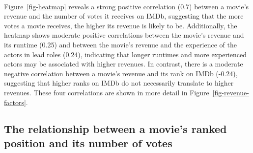 \begin{multicols}{2}
            \paragraph{}
                Figure~\ref{fig-heatmap} reveals a strong positive correlation (0.7) between a
                    movie's revenue and the number of votes it receives on IMDb, suggesting that
                    the more votes a movie receives, the higher its revenue is likely to be.
                Additionally, the heatmap shows moderate positive correlations between the
                    movie's revenue and its runtime (0.25) and between the movie's revenue and the
                    experience of the actors in lead roles (0.24), indicating that longer runtimes
                    and more experienced actors may be associated with higher revenues.
                In contrast, there is a moderate negative correlation between a movie's revenue
                    and its rank on IMDb (-0.24), suggesting that higher ranks on IMDb do not
                    necessarily translate to higher revenues.
                These four correlations are shown in more detail in
                    Figure~\ref{fig-revenue-factors}.
        \end{multicols}

    \subsection{The relationship between a movie's ranked position and its number of votes}

    \subsection*{}
        \paragraph{}


